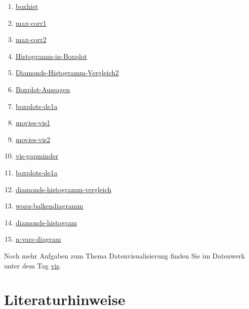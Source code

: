 \documentclass[
  letterpaper,
]{scrbook}
\providecommand{\tightlist}{%
  \setlength{\itemsep}{0pt}\setlength{\parskip}{0pt}}\usepackage{longtable,booktabs,array}
\theoremstyle{definition}
\theoremstyle{definition}
\theoremstyle{definition}
\theoremstyle{remark}
\begin{document}
\begin{enumerate}
\def\labelenumi{\arabic{enumi}.}
\tightlist
\item
  \href{https://datenwerk.netlify.app/posts/boxhist/boxhist.html}{boxhist}
\item
  \href{https://datenwerk.netlify.app/posts/max-corr1/max-corr1.html}{max-corr1}
\item
  \href{https://datenwerk.netlify.app/posts/max-corr2/max-corr2.html}{max-corr2}
\item
  \href{https://datenwerk.netlify.app/posts/histogramm-in-boxplot/histogramm-in-boxplot}{Histogramm-in-Boxplot}
\item
  \href{https://datenwerk.netlify.app/posts/diamonds-histogramm-vergleich2/diamonds-histogramm-vergleich2}{Diamonds-Histogramm-Vergleich2}
\item
  \href{https://datenwerk.netlify.app/posts/boxplot-aussagen/boxplot-aussagen}{Boxplot-Aussagen}
\item
  \href{https://datenwerk.netlify.app/posts/boxplots-de1a/boxplots-de1a.html}{boxplots-de1a}
\item
  \href{https://datenwerk.netlify.app/posts/movies-vis1/movies-vis1.html}{movies-vis1}
\item
  \href{https://datenwerk.netlify.app/posts/movies-vis2/movies-vis2.html}{movies-vis2}
\item
  \href{https://datenwerk.netlify.app/posts/vis-gapminder/vis-gapminder}{vis-gapminder}
\item
  \href{https://datenwerk.netlify.app/posts/boxplots-de1a/boxplots-de1a}{boxplots-de1a}
\item
  \href{https://datenwerk.netlify.app/posts/diamonds-histogramm-vergleich/diamonds-histogramm-vergleich}{diamonds-histogramm-vergleich}
\item
  \href{https://datenwerk.netlify.app/posts/wozu-balkendiagramm/wozu-balkendiagramm}{wozu-balkendiagramm}
\item
  \href{https://datenwerk.netlify.app/posts/diamonds-histogram/diamonds-histogram}{diamonds-histogram}
\item
  \href{https://datenwerk.netlify.app/posts/n-vars-diagram/n-vars-diagram}{n-vars-diagram}
\end{enumerate}

Noch mehr Aufgaben zum Thema Datenvisualisierung finden Sie im Datenwerk
unter dem Tag \href{https://datenwerk.netlify.app/\#category=vis}{vis}.

\section{Literaturhinweise}\label{literaturhinweise-3}
\end{document}
